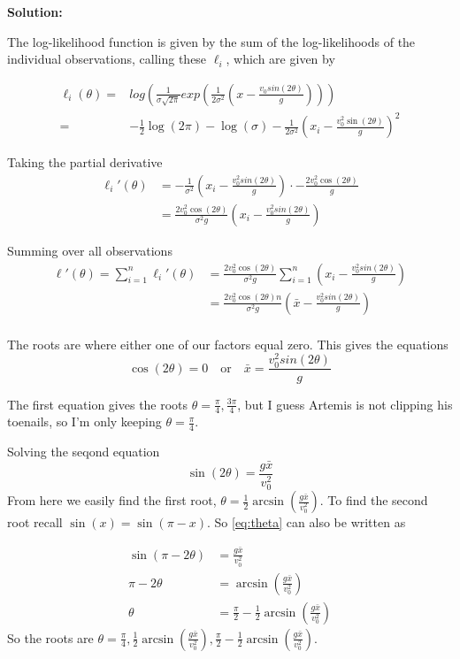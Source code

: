 \documentclass{article}
\begin{document}
\begin{enumerate}
\textbf{Solution:}
\par
The log-likelihood function is given by the sum of the log-likelihoods of the individual observations, calling these $\ell_i$, which are given by

\begin{align*}
\ell_{i}(\theta) =& log\left( \frac{1}{\sigma \sqrt{2 \pi}} exp\left(\frac{1}{2\sigma^2} \left(x- \frac{v_0 sin(2 \theta)}{g}\right)\right) \right)\\ 
=&-\frac{1}{2} \log(2\pi) - \log(\sigma) - \frac{1}{2\sigma^2} \left(x_i - \frac{v_0^2 \sin(2\theta)}{g}\right)^2 
\end{align*}

Taking the partial derivative
\begin{align*}
    \ell_{i}'(\theta) &= -\frac{1}{\sigma^2} \left( x_i  - \frac{v_0^2 sin(2 \theta)}{g}\right) \cdot -\frac{2 v_0^2 \cos(2\theta)}{g}\\
    &= \frac{2 v_0^2 \cos(2\theta)}{\sigma^2 g} \left( x_i  - \frac{v_0^2 sin(2 \theta)}{g}\right) 
\end{align*}

Summing over all observations
\begin{align*}
    \ell'(\theta) = \sum_{i=1}^n \ell_{i}'(\theta) &= \frac{2 v_0^2 \cos(2\theta)}{\sigma^2 g} \sum_{i=1}^n \left( x_i  - \frac{v_0^2 sin(2 \theta)}{g}\right)\\
    &= \frac{2 v_0^2 \cos(2\theta) n }{\sigma^2 g} \left( \bar{x}  - \frac{v_0^2 sin(2 \theta)}{g}\right)\\    
\end{align*}

The roots are where either one of our factors equal zero. This gives the equations
\[
\cos(2\theta) = 0 \quad \text{or} \quad \bar{x}  = \frac{v_0^2 sin(2 \theta)}{g}
\]

The first equation gives the roots $\theta = \frac{\pi}{4}, \frac{3\pi}{4}$, but I guess Artemis is not clipping his toenails, so I'm only keeping 
$\theta = \frac{\pi}{4}$.

Solving the seqond equation
\begin{equation}
    \label{eq:theta}
    \sin(2 \theta) = \frac{g \bar{x}}{v_0^2}
\end{equation}
From here we easily find the first root, $\theta = \frac{1}{2} \arcsin\left( \frac{g \bar x }{v_0^2} \right)$. To find the second root recall
$ \sin(x) = \sin(\pi - x)$. So \ref{eq:theta} can also be written as

\begin{align*}
    \sin(\pi - 2 \theta) &= \frac{g \bar{x}}{v_0^2}\\
    \pi - 2 \theta &= \arcsin\left(\frac{g \bar{x}}{v_0^2}\right)\\
    \theta &= \frac{\pi}{2} - \frac{1}{2} \arcsin\left(\frac{g \bar{x}}{v_0^2}\right)
\end{align*}
So the roots are $\theta = \frac{\pi}{4}, \frac{1}{2} \arcsin\left(\frac{g\bar{x}}{v_0^2}\right), \frac{\pi}{2} - \frac{1}{2} \arcsin\left(\frac{g\bar{x}}{v_0^2}\right)$.


\end{enumerate}
\end{document}
